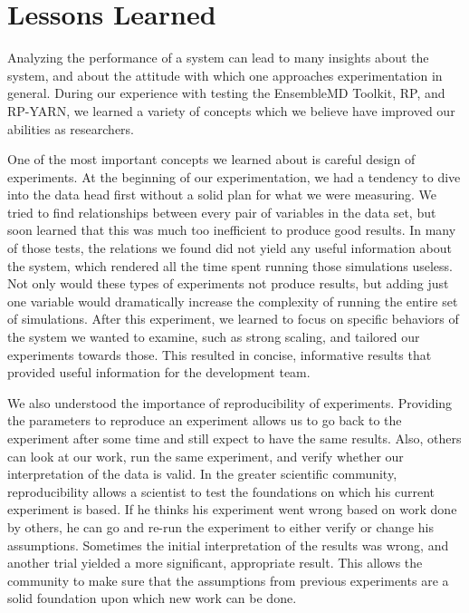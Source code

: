 \documentclass[]{article}
\begin{document}
\section{Lessons Learned}
	Analyzing the performance of a system can lead to many insights about the system, and about the attitude with which one approaches experimentation in general. During our experience with testing the EnsembleMD Toolkit, RP, and RP-YARN, we learned a variety of concepts which we believe have improved our abilities as researchers.

	One of the most important concepts we learned about is careful design of experiments. At the beginning of our experimentation, we had a tendency to dive into the data head first without a solid plan for what we were measuring. We tried to find relationships between every pair of variables in the data set, but soon learned that this was much too inefficient to produce good results. In many of those tests, the relations we found did not yield any useful information about the system, which rendered all the time spent running those simulations useless. Not only would these types of experiments not produce results, but adding just one variable would dramatically increase the complexity of running the entire set of simulations. After this experiment, we learned to focus on specific behaviors of the system we wanted to examine, such as strong scaling, and tailored our experiments towards those. This resulted in concise, informative results that provided useful information for the development team.

	We also understood the importance of reproducibility of experiments. Providing the parameters to reproduce an experiment allows us to go back to the experiment after some time and still expect to have the same results. Also, others can look at our work, run the same experiment, and verify whether our interpretation of the data is valid. In the greater scientific community, reproducibility allows a scientist to test the foundations on which his current experiment is based. If he thinks his experiment went wrong based on work done by others, he can go and re-run the experiment to either verify or change his assumptions. Sometimes the initial interpretation of the results was wrong, and another trial yielded a more significant, appropriate result. This allows the community to make sure that the assumptions from previous experiments are a solid foundation upon which new work can be done.
\end{document}
